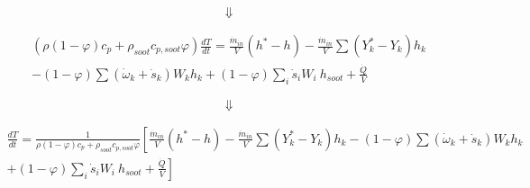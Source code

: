 \begin{equation*}
	\Downarrow
\end{equation*}


\begin{equation*}
	\begin{split}
	\left(\rho\left(1-\varphi\right)c_p+\rho_{soot}c_{p,soot}\varphi\right)\frac{dT}{dt}=
	\frac{{\dot{m}}_{in}}{V}
	\left(h^\ast-h\right)
	-
	\frac{{\dot{m}}_{in}}{V}\sum\left(Y_k^\ast-Y_k\right)h_k\\
	-
	\left(1-\varphi\right)\sum{\left({\dot{\omega}}_k
	+{\dot{s}}_k\right)W_kh_k}+\left(1-\varphi\right)\sum_{i}{{\dot{s}}_iW_i}\ h_{soot}+\frac{\dot{Q}}{V}
	\end{split}
\end{equation*}


\begin{equation*}
	\Downarrow
\end{equation*}


\begin{equation}
	\begin{split}
	\frac{dT}{dt}=
	\frac{1}{\rho\left(1-\varphi\right)c_p+\rho_{soot}c_{p,soot}\varphi}
	\left[
		\frac{{\dot{m}}_{in}}{V}
		\left(h^\ast-h\right)
		-\frac{{\dot{m}}_{in}}{V}\sum\left(Y_k^\ast-Y_k\right)h_k
		-\left(1-\varphi\right)\sum{\left({\dot{\omega}}_k
			+{\dot{s}}_k\right)W_kh_k}
	\right.
	\\
	\left.
	+\left(1-\varphi\right)\sum_{i}{{\dot{s}}_iW_i}\ h_{soot}+\frac{\dot{Q}}{V}
	\right]
	\end{split}
\end{equation}

